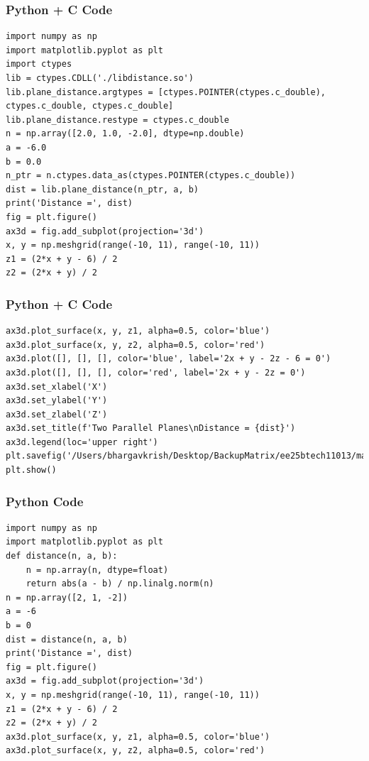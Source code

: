 \documentclass{beamer}
\begin{document}
\begin{frame}[fragile]
    \frametitle{Python + C Code }

    \begin{lstlisting}
import numpy as np
import matplotlib.pyplot as plt
import ctypes
lib = ctypes.CDLL('./libdistance.so')
lib.plane_distance.argtypes = [ctypes.POINTER(ctypes.c_double), ctypes.c_double, ctypes.c_double]
lib.plane_distance.restype = ctypes.c_double
n = np.array([2.0, 1.0, -2.0], dtype=np.double)
a = -6.0
b = 0.0
n_ptr = n.ctypes.data_as(ctypes.POINTER(ctypes.c_double))
dist = lib.plane_distance(n_ptr, a, b)
print('Distance =', dist)
fig = plt.figure()
ax3d = fig.add_subplot(projection='3d')
x, y = np.meshgrid(range(-10, 11), range(-10, 11))
z1 = (2*x + y - 6) / 2
z2 = (2*x + y) / 2

    \end{lstlisting}
\end{frame}

\begin{frame}[fragile]
    \frametitle{Python + C Code }

    \begin{lstlisting}
ax3d.plot_surface(x, y, z1, alpha=0.5, color='blue')
ax3d.plot_surface(x, y, z2, alpha=0.5, color='red')
ax3d.plot([], [], [], color='blue', label='2x + y - 2z - 6 = 0')
ax3d.plot([], [], [], color='red', label='2x + y - 2z = 0')
ax3d.set_xlabel('X')
ax3d.set_ylabel('Y')
ax3d.set_zlabel('Z')
ax3d.set_title(f'Two Parallel Planes\nDistance = {dist}')
ax3d.legend(loc='upper right')
plt.savefig('/Users/bhargavkrish/Desktop/BackupMatrix/ee25btech11013/matgeo/4.6.1/figs/Figure_1.png')
plt.show()

    \end{lstlisting}
\end{frame}

\begin{frame}[fragile]
    \frametitle{Python Code }

    \begin{lstlisting}
import numpy as np
import matplotlib.pyplot as plt
def distance(n, a, b):
    n = np.array(n, dtype=float)
    return abs(a - b) / np.linalg.norm(n)
n = np.array([2, 1, -2])
a = -6
b = 0
dist = distance(n, a, b)
print('Distance =', dist)
fig = plt.figure()
ax3d = fig.add_subplot(projection='3d')
x, y = np.meshgrid(range(-10, 11), range(-10, 11))
z1 = (2*x + y - 6) / 2
z2 = (2*x + y) / 2
ax3d.plot_surface(x, y, z1, alpha=0.5, color='blue')
ax3d.plot_surface(x, y, z2, alpha=0.5, color='red')


    \end{lstlisting}
\end{frame}
\end{document}
